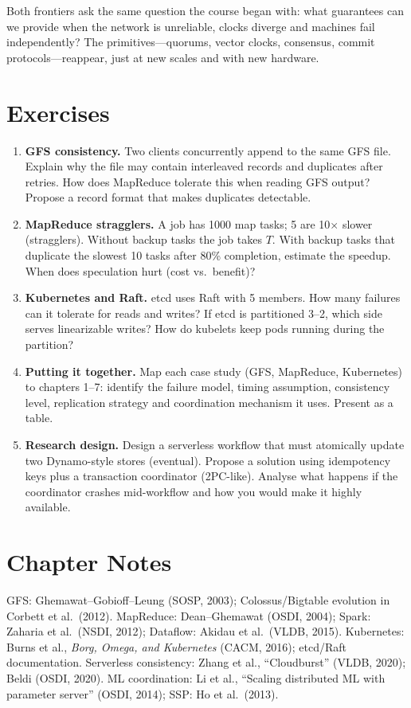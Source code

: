 Both frontiers ask the same question the course began with: what guarantees can we provide when the network is unreliable, clocks diverge and machines fail independently? The primitives---quorums, vector clocks, consensus, commit protocols---reappear, just at new scales and with new hardware.

\section{Exercises}
\label{sec:ch08-exercises}
\begin{enumerate}[label=E8.\arabic*, leftmargin=*, itemsep=0.6em]
    \item \textbf{GFS consistency.} Two clients concurrently append to the same GFS file. Explain why the file may contain interleaved records and duplicates after retries. How does MapReduce tolerate this when reading GFS output? Propose a record format that makes duplicates detectable.
    \item \textbf{MapReduce stragglers.} A job has 1000 map tasks; 5 are 10$\times$ slower (stragglers). Without backup tasks the job takes $T$. With backup tasks that duplicate the slowest 10 tasks after 80\% completion, estimate the speedup. When does speculation hurt (cost vs.\ benefit)?
    \item \textbf{Kubernetes and Raft.} etcd uses Raft with 5 members. How many failures can it tolerate for reads and writes? If etcd is partitioned 3--2, which side serves linearizable writes? How do kubelets keep pods running during the partition?
    \item \textbf{Putting it together.} Map each case study (GFS, MapReduce, Kubernetes) to chapters 1--7: identify the failure model, timing assumption, consistency level, replication strategy and coordination mechanism it uses. Present as a table.
    \item \textbf{Research design.} Design a serverless workflow that must atomically update two Dynamo-style stores (eventual). Propose a solution using idempotency keys plus a transaction coordinator (2PC-like). Analyse what happens if the coordinator crashes mid-workflow and how you would make it highly available.
\end{enumerate}

\section*{Chapter Notes}
GFS: Ghemawat--Gobioff--Leung (SOSP, 2003); Colossus/Bigtable evolution in Corbett et al.\ (2012). MapReduce: Dean--Ghemawat (OSDI, 2004); Spark: Zaharia et al.\ (NSDI, 2012); Dataflow: Akidau et al.\ (VLDB, 2015). Kubernetes: Burns et al., \emph{Borg, Omega, and Kubernetes} (CACM, 2016); etcd/Raft documentation. Serverless consistency: Zhang et al., ``Cloudburst'' (VLDB, 2020); Beldi (OSDI, 2020). ML coordination: Li et al., ``Scaling distributed ML with parameter server'' (OSDI, 2014); SSP: Ho et al.\ (2013).

